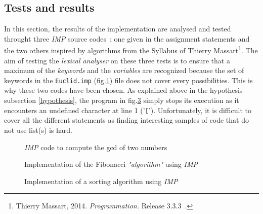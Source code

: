 \documentclass[a4paper,11pt]{article}
\begin{document}
  \subsection{Tests and results}
    \label{subsec:testscanner}
    In this section, the results of the implementation are analysed and tested throught three \textit{IMP} source codes~: one given in the assignment statements and the two others inspired by algorithms from the Syllabus of Thierry Massart\footnote{Thierry Massart, 2014. \textit{Programmation.} Release 3.3.3~.}. The aim of testing the \textit{lexical analyser} on these three tests is to ensure that a maximum of the \textit{keywords} and the \textit{variables} are recognized because the set of keywords in the \verb|Euclid.imp| (fig.\ref{code:euclid}) file does not cover every possibilities. This is why these two codes have been chosen. As explained above in the hypothesis subsection \ref{hypothesis}, the program in fig.\ref{code:sort} simply stops its execution as it encounters an undefined character at line 1 ('\verb|[|'). Unfortunately, it is difficult to cover all the different statements as finding interesting samples of code that do not use list(s) is hard.
    \begin{figure}[h!] %
      
      \caption{\textit{IMP} code to compute the gcd of two numbers}
      \label{code:euclid}
    \end{figure}
    \begin{figure}[h!]
      
      \caption{Implementation of the Fibonacci \textit{"algorithm"} using \textit{IMP}}
      \label{code:fibonacci}
    \end{figure}
    \begin{figure}[h!]
      
      \caption{Implementation of a sorting algorithm using \textit{IMP}}
      \label{code:sort}
    \end{figure}
    
\end{document}
